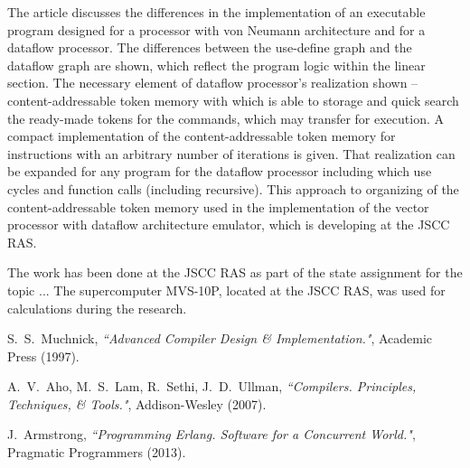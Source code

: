 \documentclass[
11pt,%
tightenlines,%
twoside,%
onecolumn,%
nofloats,%
nobibnotes,%
nofootinbib,%
superscriptaddress,%
noshowpacs,%
centertags]%
{revtex4}
\begin{document}
The article discusses the differences in the implementation of an executable program designed for a processor with von Neumann architecture and for a dataflow processor. The differences between the use-define graph and the dataflow graph are shown, which reflect the program logic within the linear section. The necessary element of dataflow processor’s realization shown -- content-addressable token memory with which is able to storage and quick search the ready-made tokens for the commands, which may transfer for execution. A compact implementation of the content-addressable token memory for instructions with an arbitrary number of iterations is given. That realization can be expanded for any program for the dataflow processor including which use cycles and function calls (including recursive). This approach to organizing of the content-addressable token memory used in the implementation of the vector processor with dataflow architecture emulator, which is developing at the JSCC RAS.

\begin{acknowledgments}
The work has been done at the JSCC RAS as part of the state assignment for the topic ... The supercomputer MVS-10P, located at the JSCC RAS, was used for calculations during the research.
\end{acknowledgments}

\begin{thebibliography}{99}

S.~S.~Muchnick, {\it ``Advanced Compiler Design \& Implementation."}, Academic Press (1997).

A.~V.~Aho, M.~S.~Lam, R.~Sethi, J.~D.~Ullman, {\it ``Compilers. Principles, Techniques, \& Tools."}, Addison-Wesley (2007).

J.~Armstrong, {\it ``Programming Erlang. Software for a Concurrent World."}, Pragmatic Programmers (2013).

\end{thebibliography}
\end{document}
